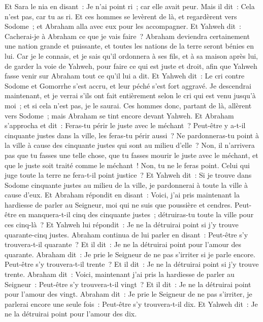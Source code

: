 \begin{multicols}{2}
Et Sara le nia en disant~: Je n'ai point ri~; car elle avait peur. Mais il dit~: Cela n'est pas, car tu as ri.
Et ces hommes se levèrent de là, et regardèrent vers Sodome~; et Abraham alla avec eux pour les accompagner.
Et Yahweh dit~: Cacherai-je à Abraham ce que je vais faire~?
Abraham deviendra certainement une nation grande et puissante, et toutes les nations de la terre seront bénies en lui.
Car je le connais, et je sais qu'il ordonnera à ses fils, et à sa maison après lui, de garder la voie de Yahweh, pour faire ce qui est juste et droit, afin que Yahweh fasse venir sur Abraham tout ce qu'il lui a dit.
Et Yahweh dit~: Le cri contre Sodome et Gomorrhe s'est accru, et leur péché s'est fort aggravé.
Je descendrai maintenant, et je verrai s'ils ont fait entièrement selon le cri qui est venu jusqu'à moi~; et si cela n'est pas, je le saurai.
Ces hommes donc, partant de là, allèrent vers Sodome~; mais Abraham se tint encore devant Yahweh.
Et Abraham s'approcha et dit~: Feras-tu périr le juste avec le méchant~?
Peut-être y a-t-il cinquante justes dans la ville, les feras-tu périr aussi~? Ne pardonneras-tu point à la ville à cause des cinquante justes qui sont au milieu d'elle~?
Non, il n'arrivera pas que tu fasses une telle chose, que tu fasses mourir le juste avec le méchant, et que le juste soit traité comme le méchant~! Non, tu ne le feras point. Celui qui juge toute la terre ne fera-t-il point justice~?
Et Yahweh dit~: Si je trouve dans Sodome cinquante justes au milieu de la ville, je pardonnerai à toute la ville à cause d'eux.
Et Abraham répondit en disant~: Voici, j'ai pris maintenant la hardiesse de parler au Seigneur, moi qui ne suis que poussière et cendres.
Peut-être en manquera-t-il cinq des cinquante justes~; détruiras-tu toute la ville pour ces cinq-là~? Et Yahweh lui répondit~: Je ne la détruirai point si j'y trouve quarante-cinq justes.
Abraham continua de lui parler en disant~: Peut-être s'y trouvera-t-il quarante~? Et il dit~: Je ne la détruirai point pour l'amour des quarante.
Abraham dit~: Je prie le Seigneur de ne pas s'irriter si je parle encore. Peut-être s'y trouvera-t-il trente~? Et il dit~: Je ne la détruirai point si j'y trouve trente.
Abraham dit~: Voici, maintenant j'ai pris la hardiesse de parler au Seigneur~: Peut-être s'y trouvera-t-il vingt~? Et il dit~: Je ne la détruirai point pour l'amour des vingt.
Abraham dit~: Je prie le Seigneur de ne pas s'irriter, je parlerai encore une seule fois~: Peut-être s'y trouvera-t-il dix. Et Yahweh dit~: Je ne la détruirai point pour l'amour des dix.

\end{multicols}
